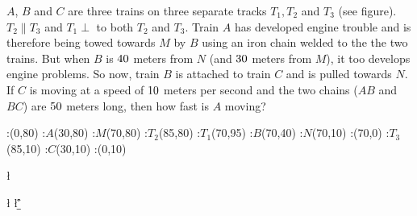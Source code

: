 


\question[4] $A$, $B$ and $C$ are three trains on three separate tracks $T_1, T_2$ and $T_3$ (see figure). 
$T_2\parallel T_3$ and $T_1\perp$ to both $T_2$ and $T_3$. Train $A$ has developed engine 
trouble and is therefore being towed towards $M$ by $B$ using an iron chain welded to the 
the two trains. But when $B$ is $40$ meters from $N$ (and $30$ meters from $M$), it too
develops engine problems. So now, train $B$ is attached to train $C$ and is pulled towards $N$.
If $C$ is moving at a speed of $10$ meters per second and the two chains ($AB$ and $BC$)
are $50$ meters long, then how fast is $A$ moving? 

\watchout[-5cm]

\vspace{1cm}
  :(0,80) %
  :$A$(30,80)
  :$M$(70,80)
  :$T_2$(85,80)
  :$T_1$(70,95) %
  :$B$(70,40)
  :$N$(70,10)
  :(70,0)
  :$T_3$(85,10) %
  :$C$(30,10)
  :(0,10)
\figdrawbegin{}
  \figdrawline [100,101,102,103]
  \figdrawline [104,105,106,107]
  \figdrawline [108,109,110]
  \figdrawline [101,105,109]
\figdrawend
{}
\centerline{\box\figBoxA}

\ADD\va\vb\p

\POWER{}\l %
\POWER{}\bns
\POWER{}\bms

\SUBTRACT\l\bns\cn
\SUBTRACT\l\bms\am
\SQRT\cn\q
\SQRT\am\r

\FRACMULT\va\q\r\vb\a\b
\FRACMULT\b\a{}\e\f

